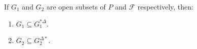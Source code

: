 If $G_1$ and $G_2$ are open subsets of $P$ and $\mathcal{F}$ respectively, then:
\begin{enumerate}
\item $G_1 \subseteq G_1^{*\Delta}$.
\item $G_2 \subseteq G_2^{\Delta*}$.
\end{enumerate}
